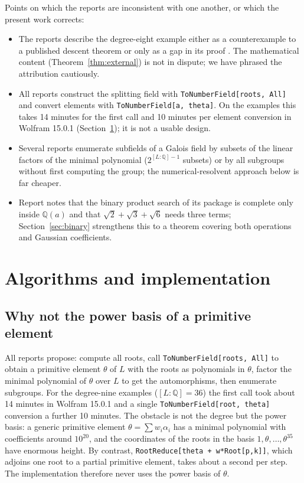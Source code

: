 \documentclass[11pt,a4paper]{article}
\theoremstyle{definition}
\theoremstyle{remark}
\newcommand{\Q}{\mathbb{Q}}
\newcommand{\code}[1]{\texttt{#1}}
\begin{document}
Points on which the reports are inconsistent with one another, or which the present work corrects:
\begin{itemize}
\item The reports describe the degree-eight example either as a counterexample to a published
  descent theorem \cite{r1,r7} or only as a gap in its proof \cite{r3}.  The mathematical content
  (Theorem~\ref{thm:external}) is not in dispute; we have phrased the attribution cautiously.
\item All reports construct the splitting field with \code{ToNumberField[roots, All]} and convert
  elements with \code{ToNumberField[a, theta]}.  On the examples this takes 14 minutes for the first
  call and 10 minutes per element conversion in Wolfram 15.0.1 (Section~\ref{sec:impl}); it is not a
  usable design.
\item Several reports enumerate subfields of a Galois field by subsets of the linear factors of the
  minimal polynomial ($2^{[L:\Q]-1}$ subsets) or by all subgroups without first computing the group;
  the numerical-resolvent approach below is far cheaper.
\item Report \cite{r9} notes that the binary product search of its package is complete only inside
  $\Q(a)$ and that $\sqrt2+\sqrt3+\sqrt6$ needs three terms; Section~\ref{sec:binary} strengthens
  this to a theorem covering both operations and Gaussian coefficients.
\end{itemize}

\section{Algorithms and implementation}\label{sec:impl}

\subsection{Why not the power basis of a primitive element}

All reports propose: compute all roots, call \code{ToNumberField[roots, All]} to obtain a primitive
element $\theta$ of $L$ with the roots as polynomials in $\theta$, factor the minimal polynomial of
$\theta$ over $L$ to get the automorphisms, then enumerate subgroups.  For the degree-nine examples
($[L:\Q]=36$) the first call took about 14 minutes in Wolfram 15.0.1 and a single
\code{ToNumberField[root, theta]} conversion a further 10 minutes.  The obstacle is not the degree
but the power basis: a generic primitive element $\theta=\sum w_i\alpha_i$ has a minimal polynomial with
coefficients around $10^{20}$, and the coordinates of the roots in the basis $1,\theta,\dots,\theta^{35}$
have enormous height.  By contrast, \code{RootReduce[theta + w*Root[p,k]]}, which adjoins one root to a
partial primitive element, takes about a second per step.  The implementation therefore never uses the
power basis of $\theta$.
\end{document}
